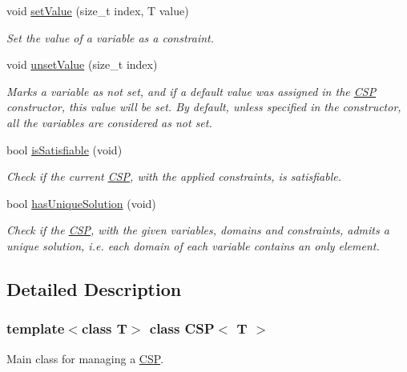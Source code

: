 \begin{DoxyCompactItemize}
void \hyperlink{classCSP_ac25064c5b2d4e1020173b56913251ebd}{setValue} (size\_\-t index, T value)
\begin{DoxyCompactList}\small\item\em Set the value of a variable as a constraint. \item\end{DoxyCompactList}\item 
void \hyperlink{classCSP_a4c0cae125a610f519dc22eaec255a0ae}{unsetValue} (size\_\-t index)
\begin{DoxyCompactList}\small\item\em Marks a variable as not set, and if a default value was assigned in the \hyperlink{classCSP}{CSP} constructor, this value will be set. By default, unless specified in the constructor, all the variables are considered as not set. \item\end{DoxyCompactList}\item 
bool \hyperlink{classCSP_a7ef9eb91c38815c9d82182696a6bd5d3}{isSatisfiable} (void)
\begin{DoxyCompactList}\small\item\em Check if the current \hyperlink{classCSP}{CSP}, with the applied constraints, is satisfiable. \item\end{DoxyCompactList}\item 
bool \hyperlink{classCSP_ae96286c6c7dfb6fe077544e0d4af15f4}{hasUniqueSolution} (void)
\begin{DoxyCompactList}\small\item\em Check if the \hyperlink{classCSP}{CSP}, with the given variables, domains and constraints, admits a unique solution, i.e. each domain of each variable contains an only element. \item\end{DoxyCompactList}\end{DoxyCompactItemize}


\subsection{Detailed Description}
\subsubsection*{template$<$class T$>$ class CSP$<$ T $>$}

Main class for managing a \hyperlink{classCSP}{CSP}. 

